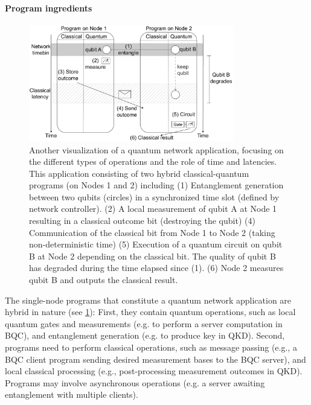 \paragraph{Program ingredients}

\begin{figure}%
    \centering
    \includegraphics[width=0.8\textwidth]{figures/qoala/program_illustration.pdf}
    \caption{Another visualization of a quantum network application, focusing on the different types of operations and the role of time and latencies.
    This application consisting of two hybrid classical-quantum programs (on Nodes 1 and 2) including
        (1) Entanglement generation between two qubits (circles) in a synchronized time slot (defined by  network controller).
        (2) A local measurement of qubit A at Node 1 resulting in a classical outcome bit (destroying the qubit)
        (4) Communication of the classical bit from Node 1 to Node 2 (taking non-deterministic time)
        (5) Execution of a quantum circuit on qubit B at Node 2 depending on the classical bit. The quality of qubit B has degraded during the time elapsed since (1). 
        (6) Node 2 measures qubit B and outputs the classical result.
    }
    \label{background:fig:program_illustration}
\end{figure}

The single-node programs that constitute a quantum network application are hybrid in nature (see \cref{background:fig:program_illustration}):
First, they contain quantum operations, such as local quantum gates and measurements (e.g. to perform a server computation in BQC), and entanglement generation (e.g. to produce key in QKD).
Second, programs need to perform classical operations, such as message passing (e.g., a BQC client program sending desired measurement bases to the BQC server), and local classical processing (e.g., post-processing measurement outcomes in QKD).
Programs may involve asynchronous operations (e.g. a server awaiting entanglement with multiple clients).


